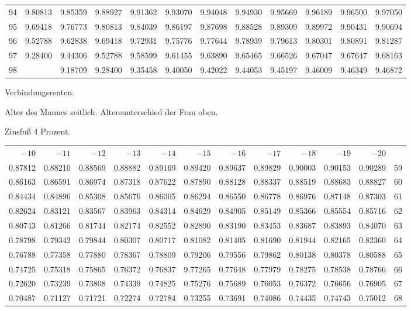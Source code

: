 \begin{center}
\begin{tabular}{|r|rrrrrrrrrrr|}
94&9.80813&9.85359&9.88927&9.91362&9.93070&9.94048&9.94930&9.95669&9.96189&9.96500&9.97050\\[5pt]
95&9.69418&9.76773&9.80813&9.84039&9.86197&9.87698&9.88528&9.89309&9.89972&9.90431&9.90694\\
96&9.52788&9.62838&9.69418&9.72931&9.75776&9.77644&9.78939&9.79613&9.80301&9.80891&9.81287\\
97&9.28400&9.44306&9.52788&9.58599&9.61455&9.63890&9.65465&9.66526&9.67047&9.67647&9.68163\\
98&&9.18709&9.28400&9.35458&9.40050&9.42022&9.44053&9.45197&9.46009&9.46349&9.46872\\
\hline\end{tabular}
\end{center}
\clearpage
{}
\begin{center}
Verbindungsrenten.\par\smallskip
Alter des Mannes seitlich. Altersunterschied der Frau oben.\par\smallskip
Zinsfuß \(4\) Prozent.\par\medskip
\fontsize{8}{10}\selectfont\setlength{\tabcolsep}{1.3pt}
\begin{tabular}{|rrrrrrrrrrr|r|}
\hline
\(-10\)&\(-11\)&\(-12\)&\(-13\)&\(-14\)&\(-15\)&\(-16\)&\(-17\)&\(-18\)&\(-19\)&\(-20\)&\\[8pt]
0.87812&0.88210&0.88569&0.88882&0.89169&0.89420&0.89637&0.89829&0.90003&0.90153&0.90289&59\\
0.86163&0.86591&0.86974&0.87318&0.87622&0.87890&0.88128&0.88337&0.88519&0.88683&0.88827&60\\
0.84434&0.84896&0.85308&0.85676&0.86005&0.86294&0.86550&0.86778&0.86976&0.87148&0.87303&61\\
0.82624&0.83121&0.83567&0.83963&0.84314&0.84629&0.84905&0.85149&0.85366&0.85554&0.85716&62\\
0.80743&0.81266&0.81744&0.82174&0.82552&0.82890&0.83190&0.83453&0.83687&0.83893&0.84070&63\\
0.78798&0.79342&0.79844&0.80307&0.80717&0.81082&0.81405&0.81690&0.81944&0.82165&0.82360&64\\[5pt]
0.76788&0.77358&0.77880&0.78367&0.78809&0.79206&0.79556&0.79862&0.80138&0.80378&0.80588&65\\
0.74725&0.75318&0.75865&0.76372&0.76837&9.77265&0.77648&0.77979&0.78275&0.78538&0.78766&66\\
0.72620&0.73239&0.73808&0.74339&0.74825&0.75276&0.75689&0.76053&0.76372&0.76656&0.76905&67\\
0.70487&0.71127&0.71721&0.72274&0.72784&0.73255&0.73691&0.74086&0.74435&0.74743&0.75012&68\\

\end{tabular}
\end{center}
